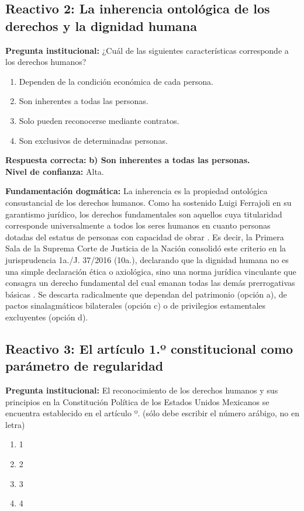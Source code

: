 \documentclass[12pt,spanish,letterpaper,oneside]{article}
\begin{document}
\subsection{Reactivo 2: La inherencia ontol\'ogica de los derechos y la dignidad humana}
\textbf{Pregunta institucional:} ¿Cu\'al de las siguientes caracter\'isticas corresponde a los derechos humanos?
\begin{enumerate}
\item[a)] Dependen de la condici\'on econ\'omica de cada persona.
\item[b)] Son inherentes a todas las personas.
\item[c)] Solo pueden reconocerse mediante contratos.
\item[d)] Son exclusivos de determinadas personas.
\end{enumerate}

\textbf{Respuesta correcta:} \textbf{b) Son inherentes a todas las personas.} \\
\textbf{Nivel de confianza:} Alta.

\textbf{Fundamentaci\'on dogm\'atica:} La inherencia es la propiedad ontol\'ogica consustancial de los derechos humanos. Como ha sostenido Luigi Ferrajoli en su garantismo jur\'idico, los derechos fundamentales son aquellos cuya titularidad corresponde universalmente a todos los seres humanos en cuanto personas dotadas del estatus de personas con capacidad de obrar \citep{ferrajoli2001}. Es decir, la Primera Sala de la Suprema Corte de Justicia de la Naci\'on consolid\'o este criterio en la jurisprudencia 1a./J. 37/2016 (10a.), declarando que la dignidad humana no es una simple declaraci\'on \'etica o axiol\'ogica, sino una norma jur\'idica vinculante que consagra un derecho fundamental del cual emanan todas las dem\'as prerrogativas b\'asicas \citep{scjnDignidad2016ADH}. Se descarta radicalmente que dependan del patrimonio (opci\'on a), de pactos sinalagm\'aticos bilaterales (opci\'on c) o de privilegios estamentales excluyentes (opci\'on d).

\subsection{Reactivo 3: El art\'iculo 1.º constitucional como par\'ametro de regularidad}
\textbf{Pregunta institucional:} El reconocimiento de los derechos humanos y sus principios en la Constituci\'on Pol\'itica de los Estados Unidos Mexicanos se encuentra establecido en el art\'iculo \underline{\hspace{1.5cm}}º. (s\'olo debe escribir el n\'umero ar\'abigo, no en letra)
\begin{enumerate}
\item[4.] 1
\item[5.] 2
\item[6.] 3
\item[7.] 4
\end{enumerate}
\end{document}
